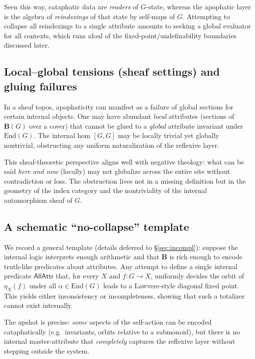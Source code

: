 \documentclass[11pt]{article}
\theoremstyle{upright}
\begin{document}
Seen this way, cataphatic data are \emph{readers} of \(G\)-state, whereas the apophatic layer is the algebra of \emph{reindexings} of that state by self-maps of \(G\). Attempting to collapse all reindexings to a single attribute amounts to seeking a global evaluator for all contexts, which runs afoul of the fixed-point/undefinability boundaries discussed later.

\subsection{Local--global tensions (sheaf settings) and gluing failures}
In a sheaf topos, apophaticity can manifest as a failure of global sections for certain internal objects. One may have abundant \emph{local} attributes (sections of \(\mathbf B(G)\) over a cover) that cannot be glued to a \emph{global} attribute invariant under \(\mathrm{End}(G)\). The internal hom \([G,G]\) may be locally trivial yet globally nontrivial, obstructing any uniform naturalization of the reflexive layer.

This sheaf-theoretic perspective aligns well with negative theology: what can be said \emph{here and now} (locally) may not globalize across the entire site without contradiction or loss. The obstruction lives not in a missing definition but in the geometry of the index category and the nontriviality of the internal automorphism sheaf of \(G\).

\subsection{A schematic ``no-collapse'' template}
We record a general template (details deferred to \S\ref{sec:incompl}): suppose the internal logic interprets enough arithmetic and that \(\mathbf B\) is rich enough to encode truth-like predicates about attributes. Any attempt to define a single internal predicate \(\mathsf{AllAttr}\) that, for every \(X\) and \(f:G\to X\), uniformly decides the orbit of \(\eta_X(f)\) under all \(\alpha\in\mathrm{End}(G)\) leads to a Lawvere-style diagonal fixed point. This yields either inconsistency or incompleteness, showing that such a totalizer cannot exist internally.

The upshot is precise: \emph{some} aspects of the self-action can be encoded cataphatically (e.g.\ invariants, orbits relative to a submonoid), but there is no internal master-attribute that \emph{completely} captures the reflexive layer without stepping outside the system.
\end{document}
